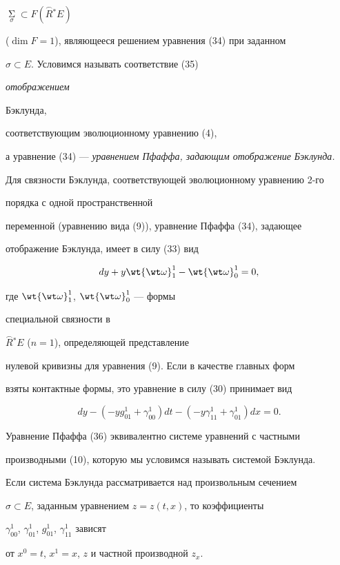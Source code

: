 $\mathop{\Sigma}\limits_\sigma \subset F (\overset{\frown}{R}{}^ * E)$


(${\dim F=1}$), являющееся решением уравнения (34) при заданном


$\sigma \subset E$. Условимся называть соответствие (35) {\it отображением 


Бэклунда,} соответствующим эволюционному уравнению (4), 


а уравнение (34) --- {\it уравнением Пфаффа, задающим отображение Бэклунда.}





Для связности Бэклунда, соответствующей эволюционному уравнению 2-го 


порядка с одной пространственной


переменной (уравнению вида (9)), уравнение Пфаффа (34), задающее 


отображение Бэклунда, имеет в силу (33) вид


$$


dy+y{\wt {\wt \omega}}_1^1-{\wt{\wt \omega}}_0^1=0,


$$


где ${\wt {\wt \omega}}_1^1$, ${\wt {\wt \omega}}_0^1$ --- формы 


специальной связности в


$\overset{\frown}{R}{}^ * E$ (${n=1}$), определяющей представление 


нулевой кривизны для уравнения (9). Если в качестве главных форм 


взяты контактные формы, это уравнение в силу (30) принимает вид


\begin{equation}


dy-({-y g_{01}^1+\gamma_{00}^1})dt-({-y\gamma_{11}^1+\gamma_{01}^1})dx=0.


\end{equation}


Уравнение Пфаффа (36) эквивалентно системе уравнений с частными 


производными (10), которую мы условимся называть системой Бэклунда.


Если система Бэклунда рассматривается над произвольным сечением


$\sigma \subset E$, заданным уравнением $z=z ({t,x})$, то коэффициенты


$\gamma_{00}^1$, $\gamma_{01}^1$, $g_{01}^1$, $\gamma_{11}^1$ зависят 


от $x^0=t$, $x^1=x$, $z$ и частной производной $z_x$.


